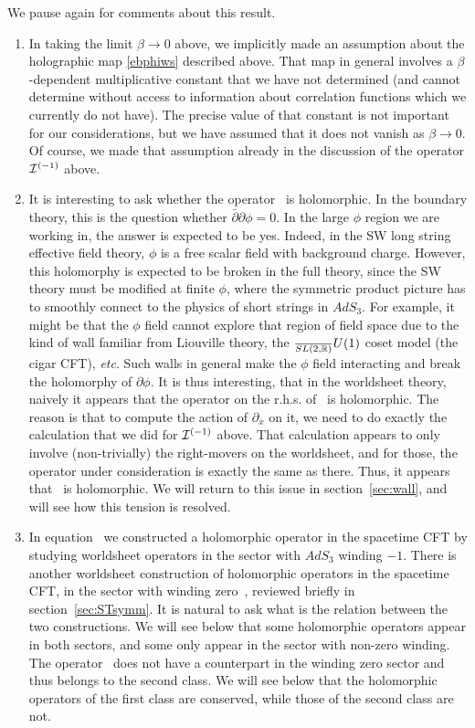 \documentclass[12pt]{article}
\def\sltwo{\ensuremath{SL(2,\bR)}}
\def\uone{U(1)}
\def\etc{{etc}}
\def\II{{\mathcal{I}}}
\newcommand{\bR}{{\mathbb R}}
\numberwithin{equation}{section}
\def\etc{{\it etc}}
\def\II{{\cal I}}
\begin{document}
\bigskip
\noindent
We pause again for comments about this result. 
\begin{enumerate}[1)]
\item
In taking the limit $\beta\to 0$ above, we implicitly made an assumption about the holographic map \eqref{ebphiws} described above. That map in general involves a $\beta$-dependent multiplicative constant that we have not determined (and cannot determine without access to information about correlation functions which we currently do not have). The precise value of that constant is not important for our considerations, but we have assumed that it does not vanish as $\beta\to 0$. Of course, we made that assumption already in the discussion of the operator $\II^{(-1)}$ above.
\item 
It is interesting to ask whether the operator \dualbbzero\ is holomorphic. In the boundary theory, this is the question whether $\bar\partial\partial\phi=0$. In the large $\phi$ region we are working in, the answer is expected to be yes. Indeed, in the SW long string effective field theory, $\phi$ is a free scalar field with background charge. However, this holomorphy is expected to be broken in the full theory, since the SW theory must be modified at finite $\phi$, where the symmetric product picture has to smoothly connect to the physics of short strings in $AdS_3$.  
For example, it might be that the $\phi$ field cannot explore that region of field space due to the kind of wall familiar from Liouville theory, the $\frac\sltwo\uone$ coset model (the cigar CFT), \etc. Such walls in general make the $\phi$ field interacting and break the holomorphy of $\partial\phi$. It is thus interesting, that in the worldsheet theory, naively it appears that the operator on the r.h.s. of \dualbbzero\ is holomorphic. 
The reason is that to compute the action of $\partial_{\bar x}$ on it, we need to do exactly the calculation that we did for $\II^{(-1)}$ above. That calculation appears to only involve (non-trivially) the right-movers on the worldsheet, and for those, the operator under consideration is exactly the same as there. Thus, it appears  that \dualbbzero\ is holomorphic. We will return to this issue in section~\ref{sec:wall}, and will see how this tension is resolved.
\item
In equation \dualbbzero\ we constructed a holomorphic operator in the spacetime CFT by studying worldsheet operators in the sector with $AdS_3$ winding $-1$. There is another worldsheet construction of holomorphic operators in the spacetime CFT, in the sector with winding zero~, reviewed briefly in section~\ref{sec:STsymm}. It is natural to ask what is the relation between the two constructions. We will see below that some holomorphic operators appear in both sectors, and some only appear in the sector with non-zero winding. The operator \dualbbzero\ does not have a counterpart in the winding zero sector and thus belongs to the second class.  We will see below that the holomorphic operators of the first class are conserved, while those of the second class are not.
%
\end{enumerate}
\end{document}
